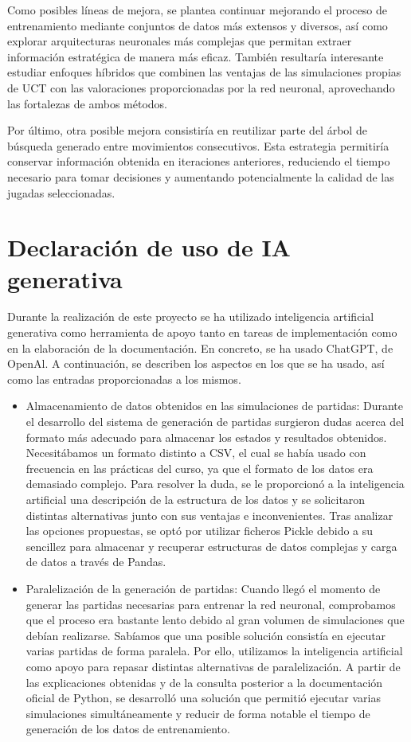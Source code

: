 \documentclass[conference,a4paper]{IEEEtran}
\begin{document}
Como posibles líneas de mejora, se plantea continuar mejorando el proceso de entrenamiento mediante conjuntos de datos más extensos y diversos, así como explorar arquitecturas neuronales más complejas que permitan extraer información estratégica de manera más eficaz. 
También resultaría interesante estudiar enfoques híbridos que combinen las ventajas de las simulaciones propias de UCT con las valoraciones proporcionadas por la red neuronal, aprovechando las fortalezas de ambos métodos. 

Por último, otra posible mejora consistiría en reutilizar parte del árbol de búsqueda generado entre movimientos consecutivos. 
Esta estrategia permitiría conservar información obtenida en iteraciones anteriores, reduciendo el tiempo necesario para tomar decisiones y aumentando potencialmente la calidad de las jugadas seleccionadas. 

\section{Declaración de uso de IA generativa} 

Durante la realización de este proyecto se ha utilizado inteligencia artificial generativa como herramienta de apoyo tanto en tareas de implementación como en la elaboración de la documentación. 
En concreto, se ha usado ChatGPT, de OpenAl. A continuación, se describen los aspectos en los que se ha usado, así como las entradas proporcionadas a los mismos. 

\begin{itemize}
\item Almacenamiento de datos obtenidos en las simulaciones de partidas: Durante el desarrollo del sistema de generación de partidas surgieron dudas acerca del formato más adecuado para almacenar los estados y resultados obtenidos. Necesitábamos un formato distinto a CSV, el cual se había usado con frecuencia en las prácticas del curso, ya que el formato de los datos era demasiado complejo. Para resolver la duda, se le proporcionó a la inteligencia artificial una descripción de la estructura de los datos y se solicitaron distintas alternativas junto con sus ventajas e inconvenientes. Tras analizar las opciones propuestas, se optó por utilizar ficheros Pickle debido a su sencillez para almacenar y recuperar estructuras de datos complejas y carga de datos a través de Pandas. 
\item Paralelización de la generación de partidas: Cuando llegó el momento de generar las partidas necesarias para entrenar la red neuronal, comprobamos que el proceso era bastante lento debido al gran volumen de simulaciones que debían realizarse. Sabíamos que una posible solución consistía en ejecutar varias partidas de forma paralela. Por ello, utilizamos la inteligencia artificial como apoyo para repasar distintas alternativas de paralelización. A partir de las explicaciones obtenidas y de la consulta posterior a la documentación oficial de Python, se desarrolló una solución que permitió ejecutar varias simulaciones simultáneamente y reducir de forma notable el tiempo de generación de los datos de entrenamiento. 
\end{itemize}
\end{document}
